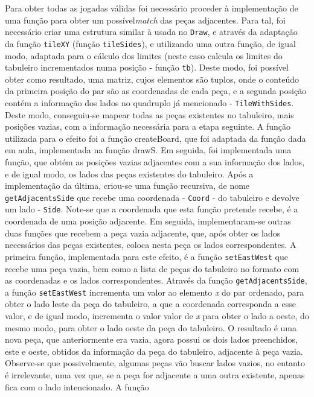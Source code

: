 Para obter todas as jogadas válidas foi necessário proceder à implementação de uma função para obter um
possível\emph{match} das peças adjacentes. Para tal, foi necessário criar uma estrutura similar à usada no
\texttt{Draw}, e através da adaptação da função \texttt{tileXY} (função \texttt{tileSides}), e utilizando
uma outra função, de igual modo, adaptada para o cálculo dos limites (neste caso calcula os limites do
tabuleiro incrementados numa posição - função \texttt{tb}). Deste modo, foi possível obter como
resultado, uma matriz, cujos elementos são tuplos, onde o conteúdo da primeira posição do par são as
coordenadas de cada peça, e a segunda posição contém a informação dos lados no quadruplo já mencionado
- \texttt{TileWithSides}. Deste modo, conseguiu-se mapear todas as peças existentes no tabuleiro, mais
posições vazias, com a informação necessária para a etapa seguinte. 
A função utilizada para o efeito foi a função createBoard, que foi adaptada da função dada em aula, implementada na função drawS. 
Em seguida, foi implementada uma
função, que obtém as posições vazias adjacentes com a sua informação dos lados, e de igual modo, os
lados das peças existentes do tabuleiro. Após a implementação da última, criou-se uma função recursiva,
de nome \texttt{getAdjacentsSide} que recebe uma coordenada - \texttt{Coord} - do tabuleiro e devolve um lado
- \texttt{Side}. Note-se que a coordenada que esta função pretende recebe, é a coordenada de uma posição
adjacente. Em seguida, implementaram-se outras duas funções que recebem a peça vazia adjacente, que, após
obter os lados necessários das peças existentes, coloca nesta peça os lados correspondentes. A primeira
função, implementada para este efeito, é a função \texttt{setEastWest} que recebe uma peça vazia, bem
como a lista de peças do tabuleiro no formato com as coordenadas e os lados correspondentes. Através da
função \texttt{getAdjacentsSide}, a função \texttt{setEastWest} incrementa um valor ao elemento \emph{x}
do par ordenado, para obter o lado leste da peça do tabuleiro, a que a coordenada corresponda a esse valor, e
de igual modo, incrementa o valor valor de \emph{x} para obter o lado a oeste, do mesmo modo, para obter o
lado oeste da peça do tabuleiro. O resultado é uma nova peça, que anteriormente era vazia, agora possui os
dois lados preenchidos, este e oeste, obtidos da informação da peça do tabuleiro, adjacente à peça vazia.
Observe-se que possivelmente, algumas peças vão buscar lados vazios, no entanto é irrelevante, uma vez que,
se a peça for adjacente a uma outra existente, apenas fica com o lado intencionado. A função
